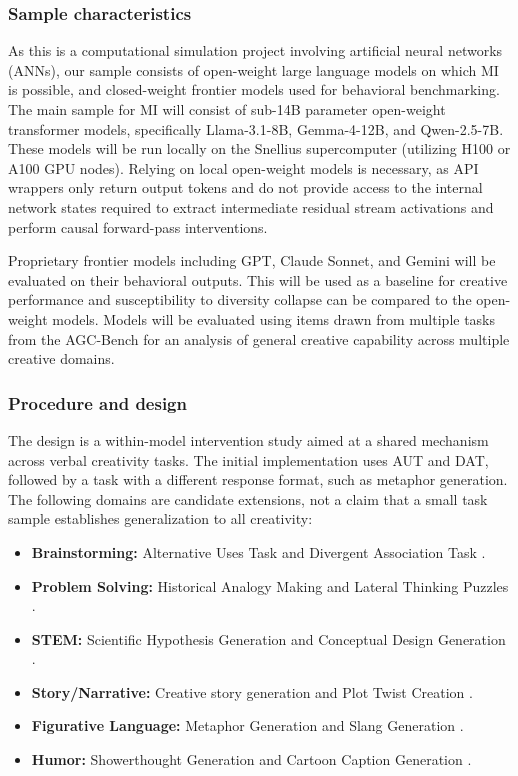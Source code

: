 \documentclass{article}
\begin{document}
\subsubsection{Sample characteristics}
As this is a computational simulation project involving artificial neural networks (ANNs), our sample consists of open-weight large language models on which MI is possible, and closed-weight frontier models used for behavioral benchmarking. The main sample for MI will consist of sub-14B parameter open-weight transformer models, specifically Llama-3.1-8B, Gemma-4-12B, and Qwen-2.5-7B. These models will be run locally on the Snellius supercomputer (utilizing H100 or A100 GPU nodes). Relying on local open-weight models is necessary, as API wrappers only return output tokens and do not provide access to the internal network states required to extract intermediate residual stream activations and perform causal forward-pass interventions. 

Proprietary frontier models including GPT, Claude Sonnet, and Gemini will be evaluated on their behavioral outputs. This will be used as a baseline for creative performance and susceptibility to diversity collapse can be compared to the open-weight models. Models will be evaluated using items drawn from multiple tasks from the AGC-Bench for an analysis of general creative capability across multiple creative domains.

\subsubsection{Procedure and design}
The design is a within-model intervention study aimed at a shared mechanism across verbal creativity tasks. The initial implementation uses AUT and DAT, followed by a task with a different response format, such as metaphor generation. The following domains are candidate extensions, not a claim that a small task sample establishes generalization to all creativity:

\begin{itemize}[noitemsep, topsep=0pt, leftmargin=1.5cm]
    \item \textbf{Brainstorming:} Alternative Uses Task \parencite{guilford1967creativity} and Divergent Association Task \parencite{olson2021naming}.
    \item \textbf{Problem Solving:} Historical Analogy Making \parencite{li2025past} and Lateral Thinking Puzzles \parencite{jiang2023brainteaser}.
    \item \textbf{STEM:} Scientific Hypothesis Generation \parencite{liu2025hypobench} and Conceptual Design Generation \parencite{ma2023conceptual}.
    \item \textbf{Story/Narrative:} Creative story generation \parencite{ismayilzada2024evaluating} and Plot Twist Creation \parencite{schapirotwistbench}.
    \item \textbf{Figurative Language:} Metaphor Generation \parencite{chakrabarty2021mermaid} and Slang Generation \parencite{wu2025language}.
    \item \textbf{Humor:} Showerthought Generation \parencite{buz2024investigating} and Cartoon Caption Generation \parencite{zhang2024humor}.
\end{itemize}
\end{document}
